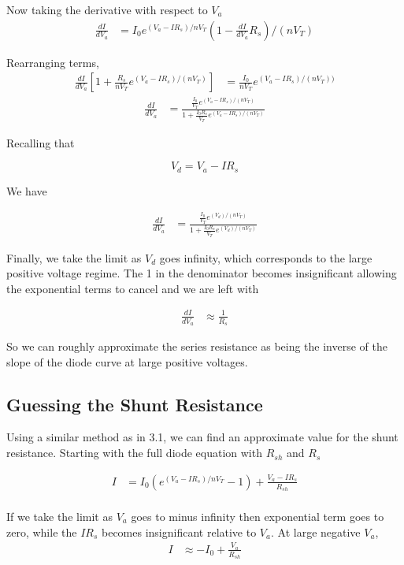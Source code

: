 \documentclass[12pt]{article}
\numberwithin{equation}{section}
\begin{document}
Now taking the derivative with respect to $V_a$
\begin{align}
\frac{dI}{dV_a} &=  I_0e^{(V_a - I R_s)/n V_T}(1-\frac{dI}{dV_a}R_s)/(nV_T)
\end{align}

Rearranging terms,
\begin{align}
\frac{dI}{dV_a} \left [1+\frac{R_s}{nV_T}e^{(V_a-IR_s)/(nV_T)} \right ] &= \frac{I_0}{nV_T}e^{(V_a-IR_s)/(nV_T))}
\end{align}
\begin{align}
\frac{dI}{dV_a} &= \frac{\frac{I_0}{V_T}e^{(V_a-IR_s)/(nV_T)}}{1+\frac{I_0R_s}{V_T}e^{(V_a-IR_s)/(nV_T)}}
\end{align}

Recalling that

\begin{equation}
V_d = V_a - I R_s
\end{equation}

We have

\begin{align}
\frac{dI}{dV_a} &= \frac{\frac{I_0}{V_T}e^{(V_d)/(nV_T)}}{1+\frac{I_0R_s}{V_T}e^{(V_d)/(nV_T)}}
\end{align}

Finally, we take the limit as $V_d$ goes infinity, which corresponds to the large positive voltage regime. The 1 in the denominator becomes insignificant allowing the exponential terms to cancel and we are left with

\begin{align}
\frac{dI}{dV_a} &\approx \frac{1}{R_s}
\end{align}

So we can roughly approximate the series resistance as being the inverse of the slope of the diode curve at large positive voltages.

\subsection{Guessing the Shunt Resistance}
Using a similar method as in 3.1, we can find an approximate value for the shunt resistance. Starting with the full diode equation with $R_{sh}$ and $R_s$

\begin{align}
I &=  I_0 (e^{(V_a - I R_s)/n V_T} - 1) + \frac{V_a - I R_s}{R_{sh}} \\
\end{align}

If we take the limit as $V_a$ goes to minus infinity then exponential term goes to zero, while the $IR_s$ becomes insignificant relative to $V_a$. At large negative $V_a$,
\begin{align}
I & \approx -I_0 +\frac{V_a}{R_{sh}}  \\
\end{align}
\end{document}
